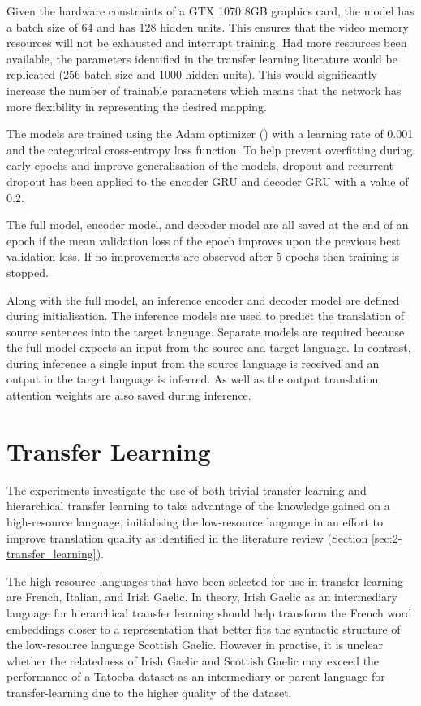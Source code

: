 Given the hardware constraints of a GTX 1070 8GB graphics card, the model has a batch size of 64 and has 128 hidden units. This ensures that the video memory resources will not be exhausted and interrupt training. Had more resources been available, the parameters identified in the transfer learning literature would be replicated (256 batch size and 1000 hidden units). This would significantly increase the number of trainable parameters which means that the network has more flexibility in representing the desired mapping.

The models are trained using the Adam optimizer (\cite{adam_optimizer_2014}) with a learning rate of 0.001 and the categorical cross-entropy loss function. To help prevent overfitting during early epochs and improve generalisation of the models, dropout and recurrent dropout has been applied to the encoder \acrshort{GRU} and decoder \acrshort{GRU} with a value of $0.2$.

The full model, encoder model, and decoder model are all saved at the end of an epoch if the mean validation loss of the epoch improves upon the previous best validation loss. If no improvements are observed after 5 epochs then training is stopped.


Along with the full model, an inference encoder and decoder model are defined during initialisation. The inference models are used to predict the translation of source sentences into the target language. Separate models are required because the full model expects an input from the source and target language. In contrast, during inference a single input from the source language is received and an output in the target language is inferred. As well as the output translation, attention weights are also saved during inference.

\section{Transfer Learning}
\label{sec:3-transfer_learning}

The experiments investigate the use of both trivial transfer learning and hierarchical transfer learning to take advantage of the knowledge gained on a high-resource language, initialising the low-resource language in an effort to improve translation quality as identified in the literature review (Section \ref{sec:2-transfer_learning}).

The high-resource languages that have been selected for use in transfer learning are French, Italian, and Irish Gaelic. In theory, Irish Gaelic as an intermediary language for hierarchical transfer learning should help transform the French word embeddings closer to a representation that better fits the syntactic structure of the low-resource language Scottish Gaelic. However in practise, it is unclear whether the relatedness of Irish Gaelic and Scottish Gaelic may exceed the performance of a Tatoeba dataset as an intermediary or parent language for transfer-learning due to the higher quality of the dataset.

